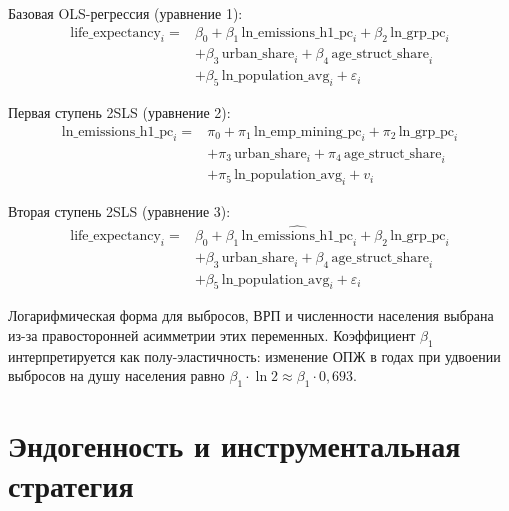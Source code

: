 \documentclass[11pt,a4paper]{article}
\begin{document}
Базовая OLS-регрессия (уравнение 1):
\begin{equation}
\label{eq:ols}
\begin{aligned}
\text{life\_expectancy}_i = {} & \beta_0 + \beta_1\,\text{ln\_emissions\_h1\_pc}_i + \beta_2\,\text{ln\_grp\_pc}_i \\
& + \beta_3\,\text{urban\_share}_i + \beta_4\,\text{age\_struct\_share}_i \\
& + \beta_5\,\text{ln\_population\_avg}_i + \varepsilon_i
\end{aligned}
\end{equation}

Первая ступень 2SLS (уравнение 2):
\begin{equation}
\label{eq:fs}
\begin{aligned}
\text{ln\_emissions\_h1\_pc}_i = {} & \pi_0 + \pi_1\,\text{ln\_emp\_mining\_pc}_i + \pi_2\,\text{ln\_grp\_pc}_i \\
& + \pi_3\,\text{urban\_share}_i + \pi_4\,\text{age\_struct\_share}_i \\
& + \pi_5\,\text{ln\_population\_avg}_i + v_i
\end{aligned}
\end{equation}

Вторая ступень 2SLS (уравнение 3):
\begin{equation}
\label{eq:ss}
\begin{aligned}
\text{life\_expectancy}_i = {} & \beta_0 + \beta_1\,\widehat{\text{ln\_emissions\_h1\_pc}}_i + \beta_2\,\text{ln\_grp\_pc}_i \\
& + \beta_3\,\text{urban\_share}_i + \beta_4\,\text{age\_struct\_share}_i \\
& + \beta_5\,\text{ln\_population\_avg}_i + \varepsilon_i
\end{aligned}
\end{equation}

Логарифмическая форма для выбросов, ВРП и численности населения выбрана из-за правосторонней асимметрии этих переменных. Коэффициент $\beta_1$ интерпретируется как полу-эластичность: изменение ОПЖ в годах при удвоении выбросов на душу населения равно $\beta_1\cdot\ln 2 \approx \beta_1\cdot 0{,}693$.

\section*{Эндогенность и инструментальная стратегия}
\end{document}
